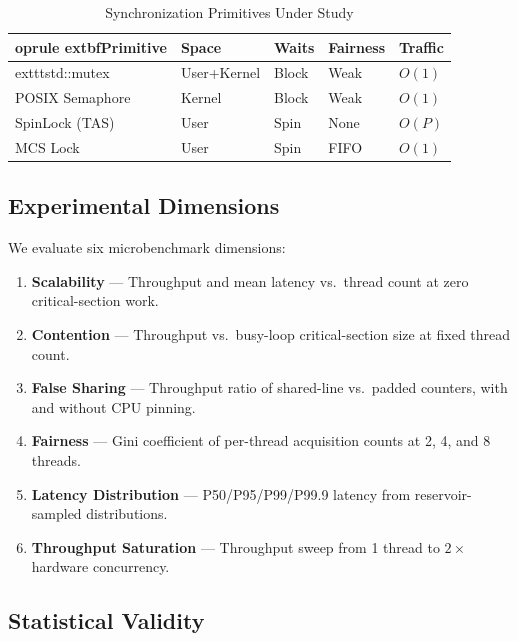 \documentclass[conference]{IEEEtran}
\begin{document}
\begin{table}[ht]
\centering
\caption{Synchronization Primitives Under Study}
\label{tab:primitives}
\renewcommand{\arraystretch}{1.2}
\begin{tabular}{lllll}
	oprule
	extbf{Primitive} & \textbf{Space} & \textbf{Waits}
  & \textbf{Fairness} & \textbf{Traffic} \\
\midrule
	exttt{std::mutex}  & User+Kernel & Block  & Weak & $O(1)$ \\
POSIX Semaphore      & Kernel      & Block  & Weak & $O(1)$ \\
SpinLock (TAS)       & User        & Spin   & None & $O(P)$ \\
MCS Lock             & User        & Spin   & FIFO & $O(1)$ \\
\bottomrule
\end{tabular}
\end{table}

\subsection{Experimental Dimensions}

We evaluate six microbenchmark dimensions:

\begin{enumerate}
    \item \textbf{Scalability} --- Throughput and mean latency vs.\ thread count at zero critical-section work.

    \item \textbf{Contention} --- Throughput vs.\ busy-loop critical-section size at fixed thread count.

    \item \textbf{False Sharing} --- Throughput ratio of shared-line vs.\ padded counters, with and without CPU pinning.

    \item \textbf{Fairness} --- Gini coefficient of per-thread acquisition counts at 2, 4, and 8 threads.

    \item \textbf{Latency Distribution} --- P50/P95/P99/P99.9 latency from reservoir-sampled distributions.

    \item \textbf{Throughput Saturation} --- Throughput sweep from 1 thread to $2\times$ hardware concurrency.
\end{enumerate}

\subsection{Statistical Validity}
\end{document}
